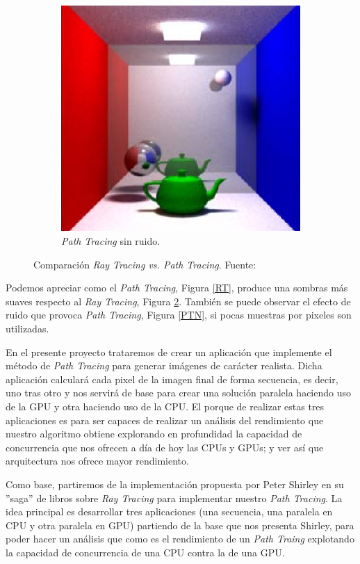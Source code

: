 \documentclass[titlepage,12pt]{report}
\begin{document}
\begin{figure}[H]
\begin{subfigure}{.3\textwidth}
		\includegraphics[width=.8\textwidth]{media/PathTracingMD.png}	
		\caption{\textit{Path Tracing} sin ruido.}
		\label{PT}
	\end{subfigure}
	\caption{Comparación \textit{Ray Tracing vs. Path Tracing}. Fuente: \citep{Cassagnabere2004}}
\end{figure}

Podemos apreciar como el \textit{Path Tracing}, Figura \ref{RT}, produce una sombras más suaves respecto al \textit{Ray Tracing}, Figura \ref{PT}. También se puede observar el efecto de ruido que provoca \textit{Path Tracing}, Figura \ref{PTN}, si pocas muestras por pixeles son utilizadas.

En el presente proyecto trataremos de crear un aplicación que implemente el método de \textit{Path Tracing} para generar imágenes de carácter realista. Dicha aplicación calculará cada pixel de la imagen final de forma secuencia, es decir, uno tras otro y nos servirá de base para crear una solución paralela haciendo uso de la GPU y otra haciendo uso de la CPU. El porque de realizar estas tres aplicaciones es para ser capaces de realizar un análisis del rendimiento que nuestro algoritmo obtiene explorando en profundidad la capacidad de concurrencia que nos ofrecen a día de hoy las CPUs y GPUs; y ver así que arquitectura nos ofrece mayor rendimiento.

Como base, partiremos de la implementación propuesta por Peter Shirley en su ''saga'' de libros sobre \textit{Ray Tracing} \citep{ShirleyRTA, ShirleyRTB, ShirleyRTC} para implementar nuestro \textit{Path Tracing}. La idea principal es desarrollar tres aplicaciones (una secuencia, una paralela en CPU y otra paralela en GPU) partiendo de la base que nos presenta Shirley, para poder hacer un análisis que como es el rendimiento de un \textit{Path Traing} explotando la capacidad de concurrencia de una CPU contra la de una GPU.
\end{document}
